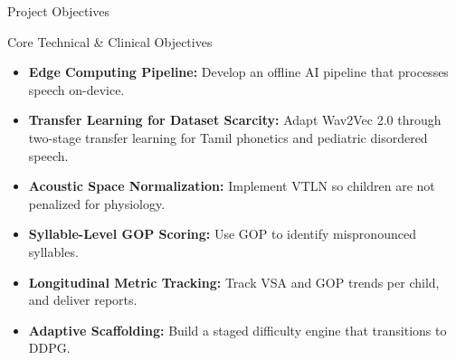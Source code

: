 \documentclass[aspectratio=169, 11pt, xcolor=table]{beamer}
\begin{document}
\begin{frame}{Project Objectives}
    \begin{block}{Core Technical \& Clinical Objectives}
        \small
        \begin{itemize}
            \setlength{\itemsep}{6pt}
            \item \textbf{Edge Computing Pipeline:} Develop an offline AI pipeline that processes speech on-device.
            \item \textbf{Transfer Learning for Dataset Scarcity:} Adapt Wav2Vec 2.0 through two-stage transfer learning for Tamil phonetics and pediatric disordered speech.
            \item \textbf{Acoustic Space Normalization:} Implement VTLN so children are not penalized for physiology.
            \item \textbf{Syllable-Level GOP Scoring:} Use GOP to identify mispronounced syllables.
            \item \textbf{Longitudinal Metric Tracking:} Track VSA and GOP trends per child, and deliver reports.
            \item \textbf{Adaptive Scaffolding:} Build a staged difficulty engine that transitions to DDPG.
        \end{itemize}
    \end{block}
\end{frame}
\end{document}
